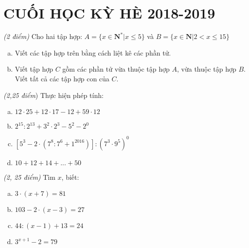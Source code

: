 \section{CUỐI HỌC KỲ HÈ 2018-2019}
\setcounter{ex}{0}
\begin{ex} 	\textit{(2 điểm)} Cho hai tập hợp: $A=\{ x \in  \mathbf{N^*}| x \leq 5\}$ và $B= \{ x \in \mathbf{N} | 2< x \leq 15 \}$

\begin{enumerate}[a)]
\item	Viết các tập hợp trên bằng cách liệt kê các phần tử.
\item Viết tập hợp $C$ gồm các phần tử vừa thuộc tập hợp $A$, vừa thuộc tập hợp $B$. Viết tất cả các tập hợp con của $C$.
\end{enumerate}
\end{ex}
\begin{ex}	\textit{(2,25 điểm}) Thực hiện phép tính:
\begin{enumerate}[a)]
\item $12 \cdot 25 + 12 \cdot 17 - 12 + 59 \cdot 12$
\item ${2^{15}}:{2^{13}} + {3^2} \cdot {2^3} - {5^2} - {2^0}$
\item $[{5^3} - 2 \cdot ({7^8}:{7^6} + {1^{2016}})]:{({7^3} \cdot {9^5})^0}$
\item $10 + 12 + 14 + ... + 50$
\end{enumerate}
\end{ex}
\begin{ex}	\textit{(2, 25 điểm)} Tìm $x$, biết:
\begin{multicols}{2}
\begin{enumerate}[a)]
\item $3 \cdot (x + 7) = 81$
\item $103 - 2 \cdot (x - 3) = 27$
\item $44:(x - 1) + 13 = 24$
\item ${3^{x + 1}} - 2 = 79$
\end{enumerate}
\end{multicols}
\end{ex}
